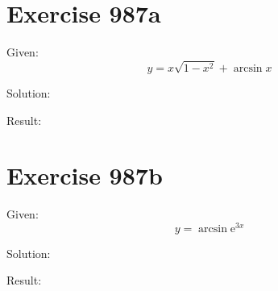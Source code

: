 \documentclass[a4paper, 10pt]{scrartcl}
\newcommand*\euler{\mathrm{e}}
\begin{document}
\section{Exercise 987a}

Given:
\[
y = x\sqrt{1 - x^{2}} + \arcsin{x}
\]

Solution:

Result:

\section{Exercise 987b}

Given:
\[
y = \arcsin{\euler^{3x}}
\]

Solution:

Result:
\end{document}
